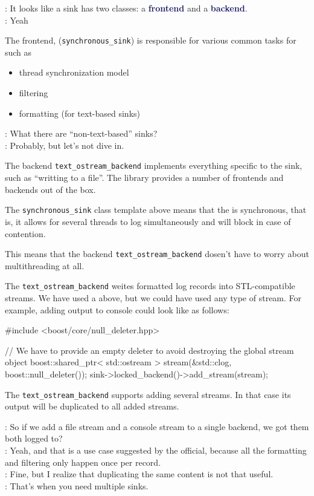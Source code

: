 \documentclass[dvipsnames]{article}
\newcommand{\mycola}{MidnightBlue}
\newcommand{\Cola}[1]{\textcolor{\mycola}{\textbf{#1}}}
\let\emph\relax %
\begin{document}
\begin{tcolorbox}
   : It looks like a sink has two classes: a \Cola{frontend} and a \Cola{ backend}.\\
   : Yeah
\end{tcolorbox}
The frontend, (\texttt{synchronous\_sink}) is responsible for various common tasks for \emph{all sinks} such as
\begin{itemize}
\item thread synchronization model
\item filtering               %
\item formatting (for text-based sinks)
\end{itemize}
\begin{tcolorbox}
   : What there are ``non-text-based'' sinks?\\
   : Probably, but let's not dive in.
\end{tcolorbox}

The backend \verb|text_ostream_backend| implements everything specific to the
sink, such as ``writting to a file''. The library provides a number of
frontends and backends out of the box.

The \verb|synchronous_sink| class template above means that the \emph{sink} is
synchronous, that is, it allows for several threads to log simultaneously and
will block in case of contention.

This means that the backend \verb|text_ostream_backend| dosen't have to worry
about multithreading at all.

The \verb|text_ostream_backend| weites formatted log records into
STL-compatible streams. We have used a \emph{file stream} above, but we could
have used any type of stream. For example, adding output to console could look
like as follows:

\begin{simplec}
  #include <boost/core/null_deleter.hpp>

  // We have to provide an empty deleter to avoid destroying the global stream object
  boost::shared_ptr< std::ostream > stream(&std::clog, boost::null_deleter());
  sink->locked_backend()->add_stream(stream);
\end{simplec}

The \verb|text_ostream_backend| supports adding several streams. In that case
its output will be duplicated to all added streams.

\begin{tcolorbox}
   : So if we add a file stream and a console stream to a single
  backend, we got them both logged to?\\
   : Yeah, and that is a use case suggested by the official,
  because all the formatting and filtering only happen once per record.\\

   : Fine, but I realize that duplicating the same content is not
  that useful.\\
   : That's when you need multiple sinks.
\end{tcolorbox}
\end{document}
